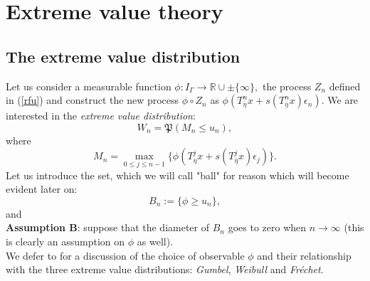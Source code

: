\documentclass{article}
\newcommand{\1}{\mathbbm{1}}
\begin{document}
\section{Extreme value theory}\label{EEVVTT}
\subsection{The extreme value distribution}\label{nb}
Let us consider  a measurable  function $\phi:I_{\Gamma}\rightarrow \mathbb{R}\cup\pm \{\infty\},$ 
the process $Z_n$ defined in (\ref{rfu}) and construct the new process $\phi\circ Z_n$ as
$
\phi(T^{n}_{\overline{\eta}}x+s(T^{n}_{\overline{\eta}}x)\epsilon_{n}).
$
We are interested in the {\em extreme value distribution}:
$$
W_n=\mathfrak{P}(M_n\le u_n),
$$
where 
$$
M_n=\max_{0\le j \le n-1}\{\phi(T^{j}_{\overline{\eta}}x+s(T^{j}_{\overline{\eta}}x)\epsilon_{j})\}.
$$
Let us introduce the set, which we will call "ball" for reason which will become evident later on:
$$
B_n:=\{\phi\ge u_n\},
$$
and \\
{\bf Assumption B}: suppose that the diameter of $B_n$  goes to zero when $n\rightarrow \infty$ (this is clearly an assumption on $\phi$ as well).\\


We defer to \cite{book} for a discussion of the choice of  observable $\phi$  and their relationship with the three extreme value distributions: {\em Gumbel}, {\em Weibull} and {\em Fr\'echet}.\\
\end{document}
